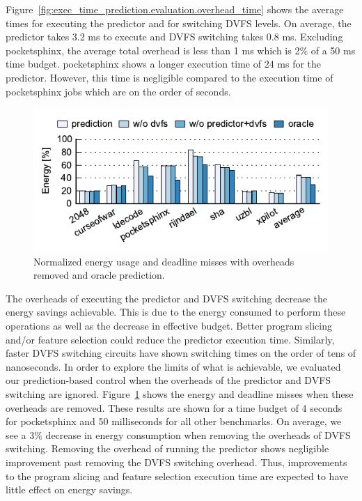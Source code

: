 Figure~\ref{fig:exec_time_prediction.evaluation.overhead_time} shows the
average times for executing the predictor and for switching DVFS levels.  On
average, the predictor takes 3.2 ms to execute and DVFS switching takes 0.8 ms.
Excluding pocketsphinx, the average total overhead is less than 1 ms which is
2\% of a 50 ms time budget.  pocketsphinx shows a longer execution time of 24 ms for the
predictor. However, this time is negligible compared to the execution time of
pocketsphinx jobs which are on the order of seconds.

\begin{figure}
  \begin{center}
    \includegraphics{exec_time_prediction/data/overhead_comparison.pdf}
    \caption{Normalized energy usage and deadline misses with overheads removed
    and oracle prediction.}
    \label{fig:exec_time_prediction.evaluation.overhead_comparison}
  \end{center}
\end{figure}

The overheads of executing the predictor and DVFS switching decrease the energy
savings achievable. This is due to the energy consumed to perform these
operations as well as the decrease in effective budget.  Better program slicing
and/or feature selection could reduce the predictor execution time.  Similarly,
faster DVFS switching circuits \cite{booster-hpca12, shortstop-vlsic13,
fgsync-micro14} have shown switching times on the order of tens of nanoseconds.
In order to explore the limits of what is achievable, we evaluated our
prediction-based control when the overheads of the predictor and DVFS switching
are ignored.
Figure~\ref{fig:exec_time_prediction.evaluation.overhead_comparison} shows the
energy and deadline misses when these overheads are removed. These results are
shown for a time budget of 4 seconds for pocketsphinx and 50 milliseconds for all other
benchmarks.  On average, we see a 3\% decrease in energy consumption when
removing the overheads of DVFS switching. Removing the overhead of running the
predictor shows negligible improvement past removing the DVFS switching
overhead. Thus, improvements to the program slicing and feature selection
execution time are expected to have little effect on energy savings.

